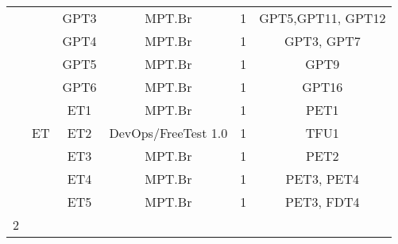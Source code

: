 \begin{table}[H]
{\begin{tabular}{|c|c|c|c|c|c|}
                                                                                        &                      & GPT3        & MPT.Br          & 1                                                                                   & GPT5,GPT11, GPT12                                                         \\ \cline{3-6} 
                                                                                        &                      & GPT4        & MPT.Br          & 1                                                                                   & GPT3, GPT7                                                                \\ \cline{3-6} 
                                                                                        &                      & GPT5        & MPT.Br          & 1                                                                                   & GPT9                                                                      \\ \cline{3-6} 
                                                                                        &                      & GPT6        & MPT.Br          & 1                                                                                   & GPT16                                                                     \\ \cline{2-6} 
& \multirow{3}{*}{ET}  
    &     ET1 & MPT.Br & 1 & PET1 \\ \cline{3-6}
    &   & ET2 & DevOps/FreeTest 1.0 & 1 & TFU1 \\ \cline{3-6} 
    &   & ET3 & MPT.Br & 1 & PET2  \\ \cline{3-6} 
    &   & ET4 & MPT.Br & 1 & PET3, PET4 \\ \cline{3-6}
    &   & ET5 & MPT.Br & 1 & PET3, FDT4 \\ \hline
\multirow{3}{*}{2}


\end{tabular}}
\end{table}

